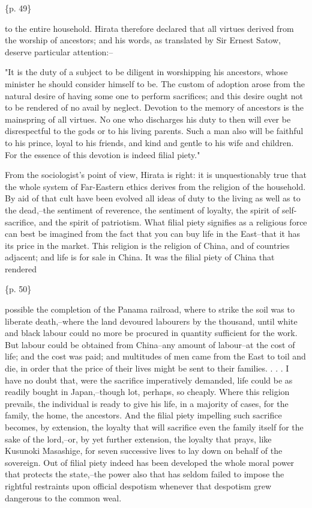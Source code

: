 \{p. 49\}

to the entire household. Hirata therefore declared that all virtues derived from the worship of ancestors; and his words, as translated by Sir Ernest Satow, deserve particular attention:--

"It is the duty of a subject to be diligent in worshipping his ancestors, whose minister he should consider himself to be. The custom of adoption arose from the natural desire of having some one to perform sacrifices; and this desire ought not to be rendered of no avail by neglect. Devotion to the memory of ancestors is the mainspring of all virtues. No one who discharges his duty to then will ever be disrespectful to the gods or to his living parents. Such a man also will be faithful to his prince, loyal to his friends, and kind and gentle to his wife and children. For the essence of this devotion is indeed filial piety."

From the sociologist's point of view, Hirata is right: it is unquestionably true that the whole system of Far-Eastern ethics derives from the religion of the household. By aid of that cult have been evolved all ideas of duty to the living as well as to the dead,--the sentiment of reverence, the sentiment of loyalty, the spirit of self-sacrifice, and the spirit of patriotism. What filial piety signifies as a religious force can best be imagined from the fact that you can buy life in the East--that it has its price in the market. This religion is the religion of China, and of countries adjacent; and life is for sale in China. It was the filial piety of China that rendered

\{p. 50\}

possible the completion of the Panama railroad, where to strike the soil was to liberate death,--where the land devoured labourers by the thousand, until white and black labour could no more be procured in quantity sufficient for the work. But labour could be obtained from China--any amount of labour--at the cost of life; and the cost was paid; and multitudes of men came from the East to toil and die, in order that the price of their lives might be sent to their families. . . . I have no doubt that, were the sacrifice imperatively demanded, life could be as readily bought in Japan,--though lot, perhaps, so cheaply. Where this religion prevails, the individual is ready to give his life, in a majority of cases, for the family, the home, the ancestors. And the filial piety impelling such sacrifice becomes, by extension, the loyalty that will sacrifice even the family itself for the sake of the lord,--or, by yet further extension, the loyalty that prays, like Kusunoki Masashige, for seven successive lives to lay down on behalf of the sovereign. Out of filial piety indeed has been developed the whole moral power that protects the state,--the power also that has seldom failed to impose the rightful restraints upon official despotism whenever that despotism grew dangerous to the common weal.



